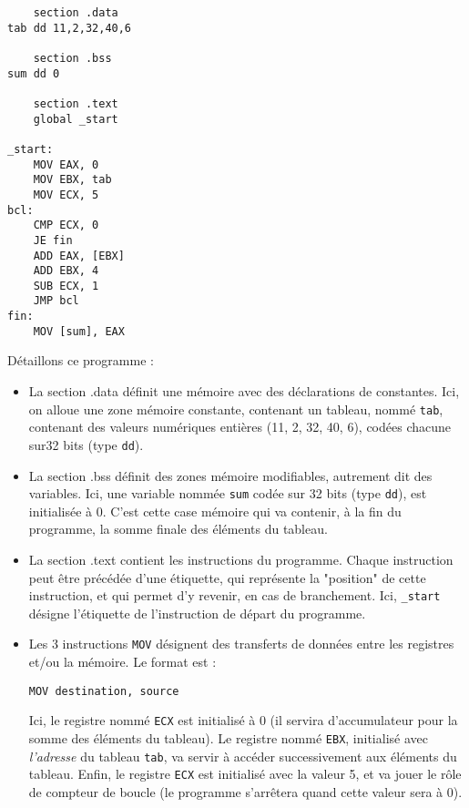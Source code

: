 \documentclass[11pt,a4paper,french,twoside]{PMCours}
\begin{document}
\begin{verbatim}
    section .data
tab dd 11,2,32,40,6

    section .bss
sum dd 0

    section .text
    global _start
    
_start:
    MOV EAX, 0
    MOV EBX, tab
    MOV ECX, 5
bcl:
    CMP ECX, 0
    JE fin
    ADD EAX, [EBX]
    ADD EBX, 4
    SUB ECX, 1
    JMP bcl
fin:
    MOV [sum], EAX
\end{verbatim}

Détaillons ce programme : 
\begin{itemize}
 \item La section .data définit une mémoire avec des déclarations de constantes. Ici, on alloue une zone mémoire constante, contenant un tableau, nommé \verb'tab', contenant des valeurs numériques entières (11, 2, 32, 40, 6), codées chacune sur32 bits (type \verb'dd').
 \item La section .bss définit des zones mémoire modifiables, autrement dit des variables. Ici, une variable nommée \verb'sum' codée sur 32 bits (type \verb'dd'), est initialisée à 0. C'est cette case mémoire qui va contenir, à la fin du programme, la somme finale des éléments du tableau.
 \item La section .text contient les instructions du programme. Chaque instruction peut être précédée d'une étiquette, qui représente la "position" de cette instruction, et qui permet d'y revenir, en cas de branchement. Ici, \verb'_start' désigne l'étiquette de l'instruction de départ du programme.
 \item Les 3 instructions \verb'MOV' désignent des transferts de données entre les registres et/ou la mémoire. Le format est :
 \begin{verbatim}
MOV destination, source
 \end{verbatim}
Ici, le registre nommé \verb'ECX' est initialisé à 0 (il servira d'accumulateur pour la somme des éléments du tableau). Le registre nommé \verb'EBX', initialisé avec \emph{l'adresse} du tableau \verb'tab', va servir à accéder successivement aux éléments du tableau. Enfin, le registre \verb'ECX' est initialisé avec la valeur 5, et va jouer le rôle de compteur de boucle (le programme s'arrêtera quand cette valeur sera à 0).

\end{itemize}
\end{document}
